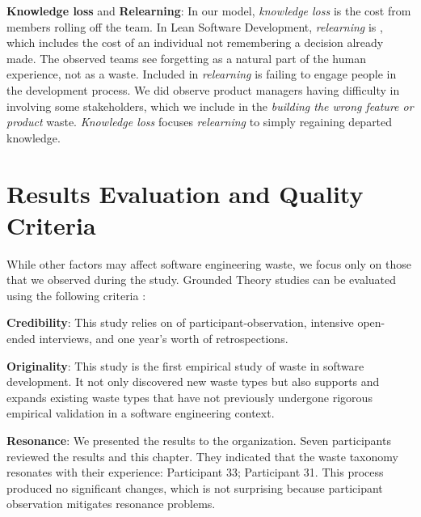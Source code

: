 \textbf{Knowledge loss} and \textbf{Relearning}:
In our model, \textit{knowledge loss} is the cost from members rolling off the team. In Lean Software Development, \textit{relearning} is  \cite{PoppendieckConceptToCash}, which includes the cost of an individual not remembering a decision already made. The observed teams see forgetting as a natural part of the human experience, not as a waste.  Included in \textit{relearning} is failing to engage people in the development process. We did observe product managers having difficulty in involving some stakeholders, which we include in the \textit{building the wrong feature or product} waste. \textit{Knowledge loss} focuses \textit{relearning} to simply regaining departed knowledge. 
\section{Results Evaluation and Quality Criteria}
\label{ResultsEvaluation}
While other factors may affect software engineering waste, we focus only on those that we observed during the study. Grounded Theory studies can be evaluated using the following criteria \cite{Charmaz, StolGroundedTheory}:

\textbf{Credibility}:   This study relies on \durationOfResearchStudyPlural{} of participant-observation, \numberOfInterviews{} intensive open-ended interviews, and one year's worth of retrospections. 

\textbf{Originality}:   This study is the first empirical study of waste in software development. It not only discovered new waste types but also supports and expands existing waste types that have not previously undergone rigorous empirical validation in a software engineering context. 

\textbf{Resonance}:  We presented the results to the organization. Seven participants reviewed the results and this chapter. They indicated that the waste taxonomy resonates with their experience:  \textemdash Participant 33;  \textemdash Participant 31. This process produced no significant changes, which is not surprising because participant observation mitigates resonance problems.


